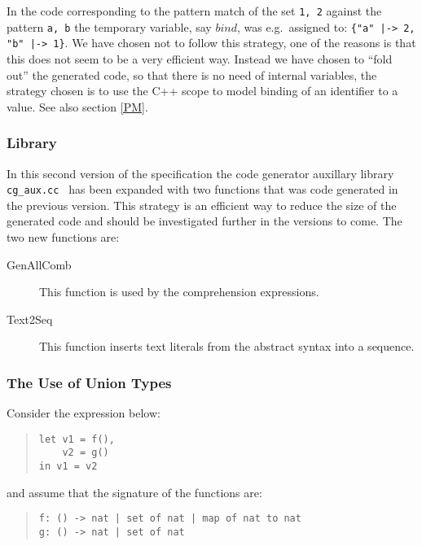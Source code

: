 \documentclass[a4paper,dvips]{article}
\begin{document}
In the code corresponding to the pattern match of the set {\tt 1, 2}
against the pattern {\tt a, b} the temporary variable, say $bind$, was
e.g.\ assigned to: {\tt \{"a" |-> 2, "b" |-> 1\}}.  We have chosen not
to follow this strategy, one of the reasons is that this does not seem
to be a very efficient way. Instead we have chosen to ``fold out'' the
generated code, so that there is no need of internal variables, the
strategy chosen is to use the C++ scope to model binding of an
identifier to a value. See also section \ref{PM}.


\subsubsection{Library}

In this second version of the specification the code generator
auxillary library {\tt cg\_aux.cc } has been expanded with two
functions that was code generated in the previous version. This
strategy is an efficient way to reduce the size of the generated code
and should be investigated further in the versions to come.  The two
new functions are:

\begin{description}
\item[GenAllComb] This function is used by the comprehension
  expressions.
\item[Text2Seq ] This function inserts text literals from the abstract
  syntax into a sequence. 
\end{description}

\subsubsection{The Use of Union Types}

Consider the expression below:

\begin{quote}
\begin{verbatim}
let v1 = f(),
    v2 = g()
in v1 = v2
\end{verbatim}
\end{quote}

and assume that the signature of the functions are:

\begin{quote}
\begin{verbatim}
f: () -> nat | set of nat | map of nat to nat
g: () -> nat | set of nat
\end{verbatim}
\end{quote}
\end{document}
